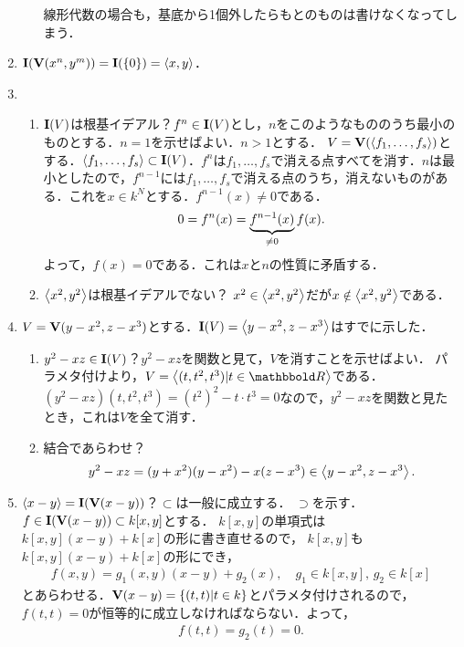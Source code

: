 \documentclass[9pt]{ltjsarticle}
\begin{document}
\begin{enumerate}[label=(問題\arabic*)]
\begin{enumerate}[label=(\alph*)]
線形代数の場合も，基底から1個外したらもとのものは書けなくなってしまう．
\end{enumerate}
 \item $\textbf I(\textbf V(x^n,y^m))=\textbf I(\{0\})=\left\langle x,y \right\rangle$．
 \item
\begin{enumerate}[label=(\alph*)]
 \item $\textbf I(V)$は根基イデアル？$f^n \in \textbf I(V)$とし，$n$をこのようなもののうち最小のものとする．$n=1$を示せばよい．$n>1$とする．  $V=\textbf V(\left\langle f_1,\dots,f_s \right\rangle)$とする．$\left\langle f_1,\dots,f_s \right\rangle\subset \textbf I(V)$．$f^n$は$f_1,\dots,f_s$で消える点すべてを消す．$n$は最小としたので，$f^{n-1}$には$f_1,\dots,f_s$で消える点のうち，消えないものがある．これを$x\in k^N$とする．$f^{n-1}(x)\neq 0$である．
\begin{align}
 0 = f^n(x) = \underbrace{f^{n-1}(x)}_{\neq 0}f(x).
\end{align}
よって，$f(x)=0$である．これは$x$と$n$の性質に矛盾する．
 \item $\left\langle x^2,y^2 \right\rangle$は根基イデアルでない？
$x^2 \in \left\langle x^2,y^2 \right\rangle$だが$x\notin \left\langle x^2,y^2 \right\rangle$である．
\end{enumerate}
 \item $V=\textbf V(y-x^2,z-x^3)$とする．$\textbf I(V)=\left\langle y-x^2,z-x^3 \right\rangle$はすでに示した．
\begin{enumerate}[label=(\alph*)]
 \item $y^2-xz \in \textbf I(V)$？$y^2-xz$を関数と見て，$V$を消すことを示せばよい．
パラメタ付けより，$V=\gen{(t,t^2,t^3)|t\in \R}$である．$(y^2-xz)(t,t^2,t^3)=(t^2)^2 - t\cdot t^3 = 0$なので，$y^2-xz$を関数と見たとき，これは$V$を全て消す．
 \item 結合であらわせ？
\begin{align}
 y^2-xz =  (y+x^2)(y-x^2) - x(z-x^3) \in \left\langle y-x^2,z-x^3 \right\rangle.
\end{align}
\end{enumerate}
 \item $\left\langle x-y \right\rangle=\textbf I(\textbf V(x-y))$？$\subset$は一般に成立する．
$\supset$を示す．$f\in \textbf I(\textbf V(x-y))\subset k[x,y]$とする．
$k[x,y]$の単項式は$k[x,y](x-y) + k[x]$の形に書き直せるので，
$k[x,y]$も$k[x,y](x-y)+k[x]$の形にでき，
\begin{align}
 f(x,y) = g_1(x,y)(x-y) + g_2(x),\quad g_1\in k[x,y],\, g_2\in k[x]
\end{align}
とあらわせる．$\textbf V(x-y)=\left\{(t,t)|t\in k\right\}$とパラメタ付けされるので，
$f(t,t)=0$が恒等的に成立しなければならない．よって，
\begin{align}
 f(t,t) = g_2(t) = 0.
\end{align}

\end{enumerate}
\end{document}
